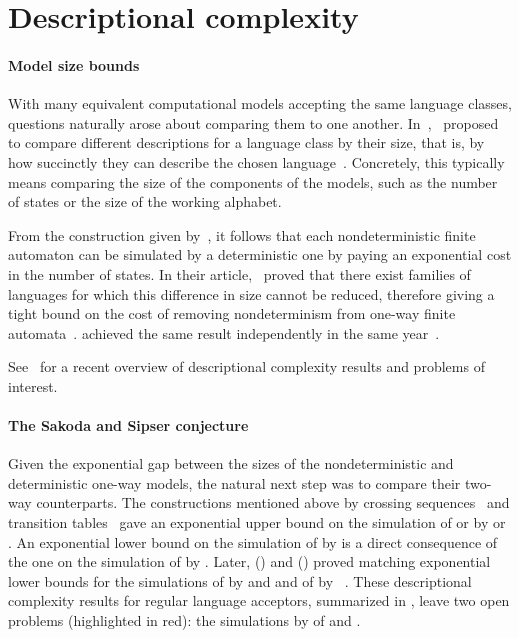 \section{Descriptional complexity}\label{sec:context-descrcomp}

\paragraph{Model size bounds} With many equivalent computational models accepting the same language classes, questions naturally arose about comparing them to one another.
In~\citeyear{MeyFis71},~\citeauthor{MeyFis71} proposed to compare different descriptions for a language class by their size, that is, by how succinctly they can describe the chosen language~\cite{MeyFis71}.
Concretely, this typically means comparing the size of the components of the models, such as the number of states or the size of the working alphabet.

From the construction given by~\citeauthor{RabSco59}, it follows that each nondeterministic finite automaton can be simulated by a deterministic one by paying an exponential cost in the number of states.
In their article,~\citeauthor{MeyFis71} proved that there exist families of languages for which this difference in size cannot be reduced, therefore giving a tight bound on the cost of removing nondeterminism from one-way finite automata~\cite{MeyFis71}.
\citeauthor{Moo71} achieved the same result independently in the same year~\cite{Moo71}.

See~\cite{KutMor+21} for a recent overview of descriptional complexity results and problems of interest.

\paragraph{The Sakoda and Sipser conjecture} Given the exponential gap between the sizes of the nondeterministic and deterministic one-way models, the natural next step was to compare their two-way counterparts.
The constructions mentioned above by crossing sequences~\cite{RabSco59} and transition tables~\cite{She59} gave an exponential upper bound on the simulation of \TNFAs or \TDFAs by \ONFAs or \ODFAs.
An exponential lower bound on the simulation of \TNFAs by \ODFAs is a direct consequence of the one on the simulation of \ONFAs by \ODFAs.
Later, \citeauthor{Bir93} (\citeyear{Bir93}) and \citeauthor{Kap05} (\citeyear{Kap05}) proved matching exponential lower bounds for the simulations of \TDFAs by \ONFAs and \ODFAs and of \TNFAs by \ONFAs~\cite{Bir93,Kap05}.
These descriptional complexity results for regular language acceptors, summarized in , leave two open problems (highlighted in red): the simulations by \TDFAs of \TNFAs and \ONFAs.

